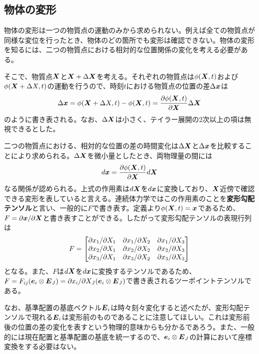 \documentclass[dvipdfmx, 9pt, a4paper]{jsarticle}
\numberwithin{equation}{section}
\newcommand{\bm}[1]{{\mbox{\boldmath $#1$}}}
\begin{document}
\subsection{物体の変形}
物体の変形は一つの物質点の運動のみから求められない。例えば全ての物質点が同様な変位を行ったとき、物体のどの箇所でも変形は確認できない。物体の変形を知るには、二つの物質点における相対的な位置関係の変化を考える必要がある。\par
そこで、物質点$\bm X$と$\bm X+\Delta \bm X$を考える。それぞれの物質点は$\phi(\bm X, t)$および$\phi(\bm X+\Delta X, t)$の運動を行うので、時刻$t$における物質点の位置の差$\Delta \bm x$は
\begin{equation}
\Delta \bm x=\phi(\bm X+\Delta X, t)-\phi(\bm X, t)=\frac{\partial \phi(\bm X, t)}{\partial \bm X}\Delta \bm X \notag
\end{equation}
のように書き表される。なお、$\Delta \bm X$は小さく、テイラー展開の2次以上の項は無視できるとした。\par
二つの物質点における、相対的な位置の差の時間変化は$\Delta \bm X$と$\Delta \bm x$を比較することにより求められる。$\Delta \bm X$を微小量としたとき、両物理量の間には
\begin{equation}
d\bm x=\frac{\partial \phi(\bm X, t)}{\partial \bm X}d\bm X
\end{equation}
なる関係が認められる。上式の作用素は$d\bm X$を$d\bm x$に変換しており、$\bm X$近傍で確認できる変形を表していると言える。連続体力学ではこの作用素のことを{\bf 変形勾配テンソル}と言い、一般的に$F$で書き表す。定義より$\phi(\bm X, t)=\bm x$であるため、$F=\partial\bm x/\partial \bm X$と書き表すことができる。したがって変形勾配テンソルの表現行列は
\begin{equation}
F=
\begin{bmatrix}
\partial x_1/\partial X_1 & \partial x_1/\partial X_2 & \partial x_1/\partial X_3 \\
\partial x_2/\partial X_1 & \partial x_2/\partial X_2 & \partial x_2/\partial X_3 \\
\partial x_3/\partial X_1 & \partial x_3/\partial X_2 & \partial x_3/\partial X_3 \\
\end{bmatrix} \notag
\end{equation}
となる。また、$F$は$d\bm X$を$d\bm x$に変換するテンソルであるため、$F=F_{ij}(\bm e_i \otimes \bm E_J)=\partial x_i/\partial X_J(\bm e_i \otimes \bm E_J)$で書き表されるツーポイントテンソルである。\par
なお、基準配置の基底ベクトル$\bm E_i$は時々刻々変化すると述べたが、変形勾配テンソルで現れる$\bm E_i$は変形前のものであることに注意してほしい。これは変形前後の位置の差の変化を表すという物理的意味からも分かるであろう。また、一般的には現在配置と基準配置の基底を統一するので、$\bm e_i \otimes \bm E_J$の計算において座標変換をする必要はない。
\end{document}
